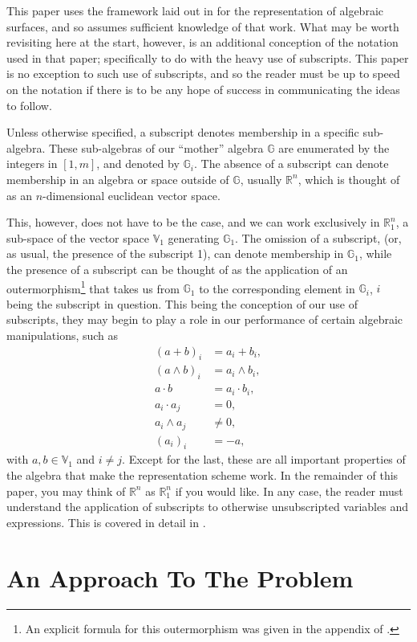 \documentclass{birkjour}
\theoremstyle{definition}
\theoremstyle{remark}
\numberwithin{equation}{section}
\newcommand{\R}{\mathbb{R}}
\newcommand{\G}{\mathbb{G}}
\newcommand{\V}{\mathbb{V}}
\begin{document}
This paper uses the framework laid out in \cite{Parkin13} for the representation of
algebraic surfaces, and so assumes sufficient knowledge of that work.
What may be worth revisiting here at the start, however, is an additional
conception of the notation used in that paper; specifically to do with the
heavy use of subscripts.  This paper is no exception to such use of subscripts,
and so the reader must be up to speed on the notation if there is
to be any hope of success in communicating the ideas to follow.

Unless otherwise specified, a subscript denotes membership in a
specific sub-algebra.  These sub-algebras of our ``mother'' algebra $\G$ are
enumerated by the
integers in $[1,m]$, and denoted by $\G_i$.  The absence of a subscript
can denote membership in an algebra or space outside of $\G$,
usually $\R^n$, which is thought of as an $n$-dimensional euclidean vector
space.

This, however, does not have to be the case, and we can work exclusively
in $\R_1^n$, a sub-space of the vector space $\V_1$ generating $\G_1$.
The omission of a subscript, (or, as usual, the presence of the subscript 1),
can denote membership in $\G_1$, while the
presence of a subscript can be thought of as the application of an
outermorphism\footnote{An explicit formula for this
outermorphism was given in the appendix of \cite{Parkin13}.}
 that takes us from $\G_1$ to the corresponding element
in $\G_i$, $i$ being the subscript in question.  This being the
conception of our use of subscripts, they may begin to play a role
in our performance of certain algebraic manipulations, such as
\begin{align*}
(a+b)_i &= a_i + b_i, \\
(a\wedge b)_i &= a_i\wedge b_i, \\
a\cdot b &= a_i\cdot b_i, \\
a_i\cdot a_j &= 0, \\
a_i\wedge a_j &\neq 0, \\
(a_i)_i &= -a,
\end{align*}
with $a,b\in\V_1$ and $i\neq j$.  Except for the last, these are all important properties
of the algebra that make the representation scheme work.
In the remainder of this paper, you may think of $\R^n$ as $\R_1^n$ if you would like.
In any case, the reader must understand the application of subscripts to otherwise
unsubscripted variables and expressions.  This is covered in detail in \cite{Parkin13}.

\section{An Approach To The Problem}
\end{document}
